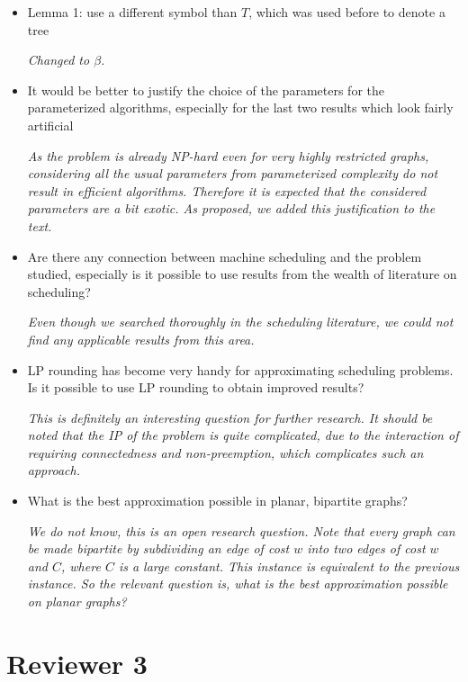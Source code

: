 \documentclass[11pt,a4paper]{article}
\begin{document}
\begin{itemize}
\item Lemma 1: use a different symbol than $T$, which was used before to denote a tree

\textit{Changed to $\beta$.}

\item It would be better to justify the choice of the parameters for the parameterized algorithms, especially for the last two results which look fairly artificial

\textit{As the problem is already NP-hard even for very highly restricted graphs, considering all the usual parameters from parameterized complexity do not result in efficient algorithms. Therefore it is expected that the considered parameters are a bit exotic. As proposed, we added this justification to the text.}

\item Are there any connection between machine scheduling and the problem studied, especially is it possible to use results from the wealth of literature on scheduling?

\textit{Even though we searched thoroughly in the scheduling literature, we could not find any applicable results from this area.}

\item LP rounding has become very handy for approximating scheduling problems. Is it possible to use LP rounding to obtain improved results?

\textit{This is definitely an interesting question for further research. 
It should be noted that the IP of the problem is quite complicated, due to the interaction of requiring connectedness and non-preemption,
which complicates such an approach.}

\item What is the best approximation possible in planar, bipartite graphs? 

\textit{We do not know, this is an open research question. Note that every graph can be made bipartite by subdividing an edge of cost $w$ into two edges of cost $w$ and $C$, where $C$ is a large constant. This instance is equivalent to the previous instance. So the relevant question is, what is the best approximation possible on planar graphs? }

\end{itemize}





\section*{Reviewer 3}
\end{document}
